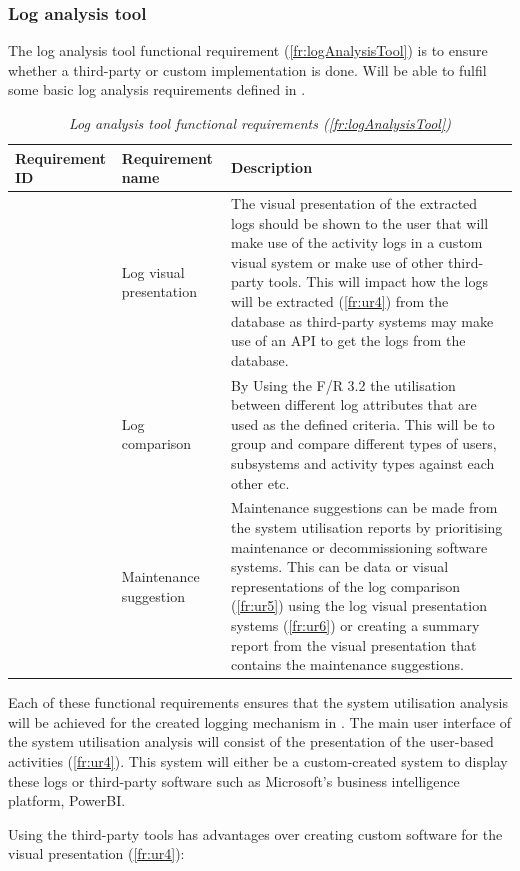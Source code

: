 \subsubsection{Log analysis tool}
The log analysis tool functional requirement (\ref{fr:logAnalysisTool}) is to ensure whether a third-party or custom implementation is done. Will be able to fulfil some basic log analysis requirements defined in .

\begin{table}[!htb]
	\centering
	\small
	\caption[Log analysis tool functional requirements (\ref{fr:logAnalysisTool})]
	{\textit{Log analysis tool functional requirements (\ref{fr:logAnalysisTool})}}
	\label{tbl:ch2_logAnalysisToolFR}
	\begin{tabularx}{\textwidth}{|l|l|X|}
		\hline \textbf{Requirement ID} & \textbf{Requirement name} & \textbf{Description} \\
		\hline \subsubphase{fr:ur4} & Log visual presentation & The visual presentation of the extracted logs should be shown to the user that will make use of the activity logs in a custom visual system or make use of other third-party tools. This will impact how the logs will be extracted (\ref{fr:ur4}) from the database as third-party systems may make use of an API to get the logs from the database. \\
		\hline \subsubphase{fr:ur5} & Log comparison & \RaggedRight By Using the F/R 3.2 the utilisation between different log attributes that are used as the defined criteria. This will be to group and compare different types of users, subsystems and activity types against each other etc.\\
		\hline \subsubphase{fr:ur6} & \RaggedRight Maintenance suggestion & Maintenance suggestions can be made from the system utilisation reports by prioritising maintenance or decommissioning software systems. This can be data or visual representations of the log comparison (\ref{fr:ur5}) using the log visual presentation systems (\ref{fr:ur6}) or creating a summary report from the visual presentation that contains the maintenance suggestions. \\
		\hline
	\end{tabularx}
\end{table}

Each of these functional requirements ensures that the system utilisation analysis will be achieved for the created logging mechanism in . The main user interface of the system utilisation analysis will consist of the presentation of the user-based activities (\ref{fr:ur4}). This system will either be a custom-created system to display these logs or third-party software such as Microsoft's business intelligence platform, PowerBI. \par Using the third-party tools has advantages over creating custom software for the visual presentation (\ref{fr:ur4}):

